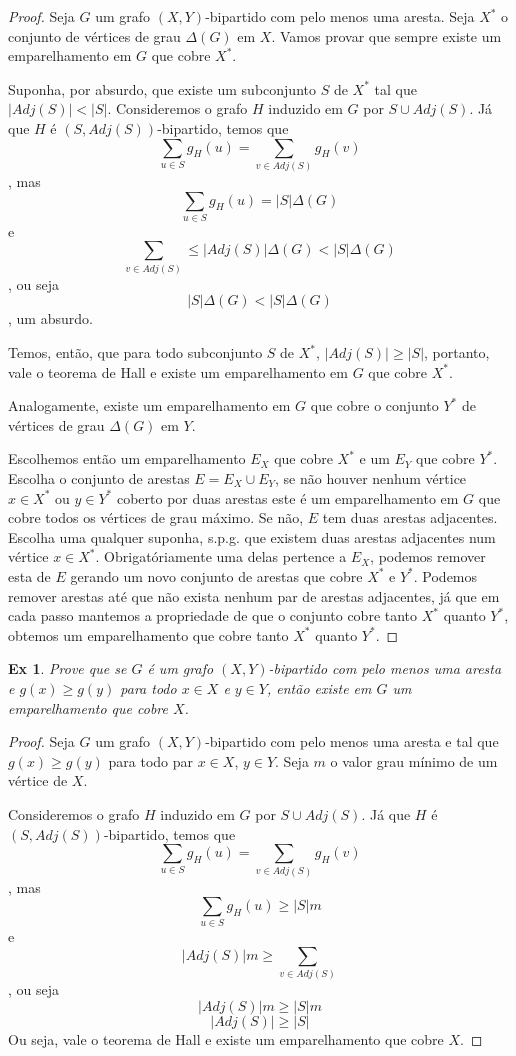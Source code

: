 \documentclass[12pt]{article}
\newcounter{exCounter}
\newtheorem{ex}[exCounter]{Ex}
\begin{document}
\begin{proof}
Seja $G$ um grafo $(X,Y)$-bipartido com pelo menos uma aresta. Seja $X^*$ o conjunto de vértices de grau $\Delta(G)$ em $X$. Vamos provar que sempre existe um emparelhamento em $G$ que cobre $X^*$.

Suponha, por absurdo, que existe um subconjunto $S$ de $X^*$ tal que $|Adj(S)| < |S|$. Consideremos o grafo $H$ induzido em $G$ por $S \cup Adj(S)$. Já que $H$ é $(S,Adj(S))$-bipartido, temos que
$$ \sum_{u \in S} g_H(u) = \sum_{v \in Adj(S)} g_H(v) $$, mas
$$ \sum_{u \in S} g_H(u) = |S| \Delta(G) $$ e
$$ \sum_{v \in Adj(S)} \leq |Adj(S)| \Delta(G) < |S| \Delta(G) $$, ou seja
$$ |S| \Delta(G) < |S| \Delta(G) $$, um absurdo.

Temos, então, que para todo subconjunto $S$ de $X^*$, $|Adj(S)| \geq |S|$, portanto, vale o teorema de Hall e existe um emparelhamento em $G$ que cobre $X^*$. 

Analogamente, existe um emparelhamento em $G$ que cobre o conjunto $Y^*$ de vértices de grau $\Delta(G)$ em $Y$.

Escolhemos então um emparelhamento $E_X$ que cobre $X^*$ e um $E_Y$ que cobre $Y^*$. Escolha o conjunto de arestas $E = E_X \cup E_Y$, se não houver nenhum vértice $x \in X^*$ ou $y \in Y^*$ coberto por duas arestas este é um emparelhamento em $G$ que cobre todos os vértices de grau máximo. Se não, $E$ tem duas arestas adjacentes. Escolha uma qualquer suponha, s.p.g. que existem duas arestas adjacentes num vértice $x \in X^*$. Obrigatóriamente uma delas pertence a $E_X$, podemos remover esta de $E$ gerando um novo conjunto de arestas que cobre $X^*$ e $Y^*$. Podemos remover arestas até que não exista nenhum par de arestas adjacentes, já que em cada passo mantemos a propriedade de que o conjunto cobre tanto $X^*$ quanto $Y^*$, obtemos um emparelhamento que cobre tanto $X^*$ quanto $Y^*$.
\end{proof}

\begin{ex}
Prove que se $G$ é um grafo $(X,Y)$-bipartido com pelo menos uma aresta e $g(x) \geq g(y)$ para todo $x \in X$ e $y \in Y$, então existe em $G$ um emparelhamento que cobre $X$.
\end{ex}

\begin{proof}
Seja $G$ um grafo $(X,Y)$-bipartido com pelo menos uma aresta e tal que $g(x) \geq g(y)$ para todo par $x \in X$, $y \in Y$. Seja $m$ o valor grau mínimo de um vértice de $X$.

Consideremos o grafo $H$ induzido em $G$ por $S \cup Adj(S)$. Já que $H$ é $(S,Adj(S))$-bipartido, temos que
$$ \sum_{u \in S} g_H(u) = \sum_{v \in Adj(S)} g_H(v) $$, mas
$$ \sum_{u \in S} g_H(u) \geq |S| m $$ e
$$ |Adj(S)| m \geq \sum_{v \in Adj(S)}$$, ou seja
$$ |Adj(S)| m \geq |S| m $$
$$ |Adj(S)| \geq |S| $$
Ou seja, vale o teorema de Hall e existe um emparelhamento que cobre $X$.
\end{proof}
\end{document}
